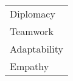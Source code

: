 \textcolor{sidebartext}{
	\begin{tabular}{l}
		Diplomacy\\
		Teamwork\\
		Adaptability\\
		Empathy
	\end{tabular}
}